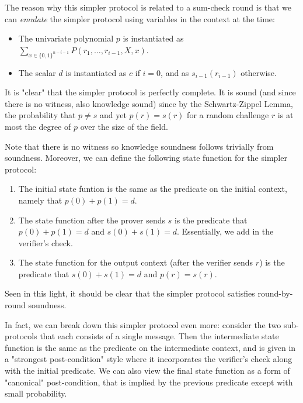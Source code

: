 The reason why this simpler protocol is related to a sum-check round is that we can \emph{emulate} the simpler protocol using variables in the context at the time:
\begin{itemize}
    \item The univariate polynomial $p$ is instantiated as $\sum_{x \in \{0, 1\}^{n - i - 1}} P(r_1, \ldots, r_{i - 1}, X, x)$.
    \item The scalar $d$ is instantiated as $c$ if $i = 0$, and as $s_{i - 1}(r_{i - 1})$ otherwise.
\end{itemize}

It is "clear" that the simpler protocol is perfectly complete. It is sound (and since there is no
witness, also knowledge sound) since by the Schwartz-Zippel Lemma, the probability that $p \ne s$
and yet $p(r) = s(r)$ for a random challenge $r$ is at most the degree of $p$ over the size of the
field.

Note that there is no witness so knowledge soundness follows trivially from soundness. Moreover, we
can define the following state function for the simpler protocol:
\begin{enumerate}
    \item The initial state funtion is the same as the predicate on the initial context, namely that
    $p(0) + p(1) = d$.
    \item The state function after the prover sends $s$ is the predicate that $p(0) + p(1) = d$ and
    $s(0) + s(1) = d$. Essentially, we add in the verifier's check.
    \item The state function for the output context (after the verifier sends $r$) is the predicate that $s(0) + s(1) = d$ and $p(r) = s(r)$.
\end{enumerate}
Seen in this light, it should be clear that the simpler protocol satisfies round-by-round soundness.

In fact, we can break down this simpler protocol even more: consider the two sub-protocols that each
consists of a single message. Then the intermediate state function is the same as the predicate on
the intermediate context, and is given in a "strongest post-condition" style where it incorporates
the verifier's check along with the initial predicate. We can also view the final state function as
a form of "canonical" post-condition, that is implied by the previous predicate except with small
probability.
